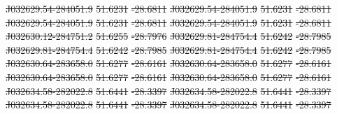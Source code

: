 \documentclass[11pt, a4paper]{book}
\providecommand{\DIFdeltex}[1]{{\protect\color{red}\sout{#1}}}                      %
\providecommand{\DIFdel}[1]{\texorpdfstring{\DIFdeltex{#1}}{}} %
\begin{document}
\DIFdel{J032629.54-284051.9 }%
\DIFdel{51.6231 }%
\DIFdel{-28.6811 }%
\DIFdel{J032629.54-284051.9 }%
\DIFdel{51.6231 }%
\DIFdel{-28.6811 }%
\DIFdel{J032629.54-284051.9 }%
\DIFdel{51.6231 }%
\DIFdel{-28.6811 }%
\DIFdel{J032629.54-284051.9 }%
\DIFdel{51.6231 }%
\DIFdel{-28.6811 }%
\DIFdel{J032630.12-284751.2 }%
\DIFdel{51.6255 }%
\DIFdel{-28.7976 }%
\DIFdel{J032629.81-284754.4 }%
\DIFdel{51.6242 }%
\DIFdel{-28.7985 }%
\DIFdel{J032629.81-284754.4 }%
\DIFdel{51.6242 }%
\DIFdel{-28.7985 }%
\DIFdel{J032629.81-284754.4 }%
\DIFdel{51.6242 }%
\DIFdel{-28.7985 }%
\DIFdel{J032630.64-283658.0 }%
\DIFdel{51.6277 }%
\DIFdel{-28.6161 }%
\DIFdel{J032630.64-283658.0 }%
\DIFdel{51.6277 }%
\DIFdel{-28.6161 }%
\DIFdel{J032630.64-283658.0 }%
\DIFdel{51.6277 }%
\DIFdel{-28.6161 }%
\DIFdel{J032630.64-283658.0 }%
\DIFdel{51.6277 }%
\DIFdel{-28.6161 }%
\DIFdel{J032634.58-282022.8 }%
\DIFdel{51.6441 }%
\DIFdel{-28.3397 }%
\DIFdel{J032634.58-282022.8 }%
\DIFdel{51.6441 }%
\DIFdel{-28.3397 }%
\DIFdel{J032634.58-282022.8 }%
\DIFdel{51.6441 }%
\DIFdel{-28.3397 }%
\DIFdel{J032634.58-282022.8 }%
\DIFdel{51.6441 }%
\DIFdel{-28.3397 }%
\end{document}
